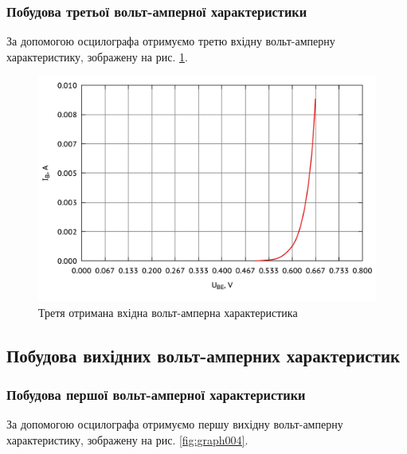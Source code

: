 \documentclass[a4paper,oneside,12pt,DIV=12,titlepage]{scrartcl}
\begin{document}
			\subsubsection{Побудова третьої вольт-амперної характеристики}
				За допомогою осцилографа отримуємо третю вхідну вольт-амперну характеристику, зображену на рис. \ref{fig:graph003}.
				
				\begin{figure}[h]
					\centering
					\includegraphics[width=0.45\textheight]{graph002-0.pdf}
					\caption{Третя отримана вхідна вольт-амперна характеристика}
					\label{fig:graph003}
				\end{figure}
				
		\subsection{Побудова вихідних вольт-амперних характеристик}
			\subsubsection{Побудова першої вольт-амперної характеристики}
				За допомогою осцилографа отримуємо першу вихідну вольт-амперну характеристику, зображену на рис. \ref{fig:graph004}.
				
\end{document}

